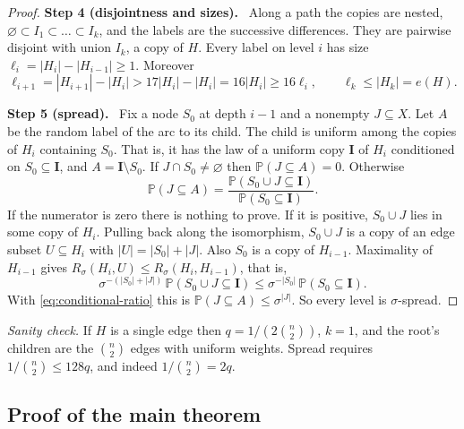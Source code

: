 \documentclass[11pt]{article}
\numberwithin{equation}{section}
\newcommand{\PP}{\mathbb P}
\newcommand{\step}[2]{\medskip\noindent\textbf{Step #1 (#2).}\ }
\begin{document}
\begin{proof}
\step{4}{disjointness and sizes}
Along a path the copies are nested,
$\varnothing\subset I_1\subset\dots\subset I_k$, and the labels are
the successive differences. They are pairwise disjoint with union
$I_k$, a copy of $H$. Every label on level $i$ has size
$\ell_i=|H_i|-|H_{i-1}|\ge1$. Moreover
\[
 \ell_{i+1}=|H_{i+1}|-|H_i|>17|H_i|-|H_i|=16|H_i|\ge16\ell_i,
 \qquad \ell_k\le|H_k|=e(H).
\]

\step{5}{spread}
Fix a node $S_0$ at depth $i-1$ and a nonempty $J\subseteq X$. Let $A$
be the random label of the arc to its child. The child is uniform
among the copies of $H_i$ containing $S_0$. That is, it has the law of
a uniform copy $\boldsymbol I$ of $H_i$ conditioned on
$S_0\subseteq\boldsymbol I$, and $A=\boldsymbol I\setminus S_0$. If
$J\cap S_0\ne\varnothing$ then $\PP(J\subseteq A)=0$. Otherwise
\begin{equation}\label{eq:conditional-ratio}
 \PP(J\subseteq A)=
 \frac{\PP(S_0\cup J\subseteq\boldsymbol I)}
      {\PP(S_0\subseteq\boldsymbol I)} .
\end{equation}
If the numerator is zero there is nothing to prove. If it is positive,
$S_0\cup J$ lies in some copy of $H_i$. Pulling back along the
isomorphism, $S_0\cup J$ is a copy of an edge subset $U\subseteq H_i$
with $|U|=|S_0|+|J|$. Also $S_0$ is a copy of $H_{i-1}$. Maximality of
$H_{i-1}$ gives $R_\sigma(H_i,U)\le R_\sigma(H_i,H_{i-1})$, that is,
\[
 \sigma^{-(|S_0|+|J|)}\,\PP(S_0\cup J\subseteq\boldsymbol I)
 \le \sigma^{-|S_0|}\,\PP(S_0\subseteq\boldsymbol I).
\]
With \eqref{eq:conditional-ratio} this is
$\PP(J\subseteq A)\le\sigma^{|J|}$. So every level is $\sigma$-spread.
\end{proof}

\emph{Sanity check.} If $H$ is a single edge then $q=1/(2\binom n2)$,
$k=1$, and the root's children are the $\binom n2$ edges with uniform
weights. Spread requires $1/\binom n2\le128q$, and indeed
$1/\binom n2=2q$.

\subsection{Proof of the main theorem}
\end{document}
